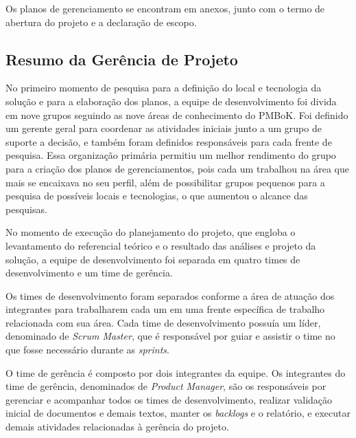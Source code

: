   Os planos de gerenciamento se encontram em anexos, junto com o termo de abertura do projeto e a declaração de escopo.
  
  \subsection{Resumo da Gerência de Projeto}
  
      No primeiro momento de pesquisa para a definição do local e tecnologia da solução e para a elaboração dos planos,
      a equipe de desenvolvimento foi divida em nove grupos seguindo as nove áreas de conhecimento do PMBoK.
      Foi definido um gerente geral para coordenar as atividades iniciais junto a um grupo de suporte a decisão, 
      e também foram definidos responsáveis para cada frente de pesquisa.
      Essa organização primária permitiu um melhor rendimento do grupo para a criação dos planos de gerenciamentos, pois cada
      um trabalhou na área que mais se encaixava no seu perfil, além de possibilitar grupos pequenos para a pesquisa de possíveis
      locais e tecnologias, o que aumentou o alcance das pesquisas.
      
      No momento de execução do planejamento do projeto, que engloba o levantamento do referencial teórico e o resultado das análises
      e projeto da solução, a equipe de desenvolvimento foi separada em quatro times de desenvolvimento e um time de gerência.
      
      Os times de desenvolvimento foram separados conforme a área de atuação dos integrantes para trabalharem cada um em uma frente
      específica de trabalho relacionada com sua área. Cada time de desenvolvimento possuía um líder, denominado de 
      \textit{Scrum Master}, que é responsável por guiar e assistir o time no que fosse necessário durante as \textit{sprints}.
      
      O time de gerência é composto por dois integrantes da equipe.
      Os integrantes do time de gerência, denominados de \textit{Product Manager}, são os responsáveis por gerenciar e acompanhar 
      todos os times de desenvolvimento, realizar validação inicial de documentos e demais textos,
      manter os \textit{backlogs} e o relatório, e executar demais atividades relacionadas à gerência do projeto.
    
